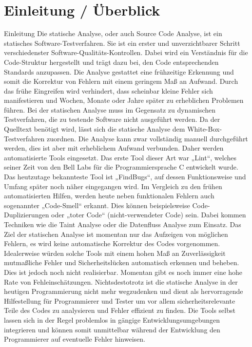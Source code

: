 \section{Einleitung / \"Uberblick}
Einleitung
Die statische Analyse, oder auch Source Code Analyse, ist ein statisches Software-Testverfahren. Sie ist ein erster und unverzichtbarer Schritt verschiedenster Software-Qualitäts-Kontrollen. Dabei wird ein Verständnis für die Code-Struktur hergestellt und trägt dazu bei, den Code entsprechenden Standards anzupassen.
Die Analyse gestattet eine frühzeitige Erkennung und somit die Korrektur von Fehlern mit einem geringem Maß an Aufwand. Durch das frühe Eingreifen wird verhindert, dass scheinbar kleine Fehler sich manifestieren und Wochen, Monate oder Jahre später zu erheblichen Problemen führen. 
Bei der statischen Analyse muss im Gegensatz zu dynamischen Testverfahren, die zu testende Software nicht ausgeführt werden. Da der Quelltext benötigt wird, lässt sich die statische Analyse dem White-Box-Testverfahren zuordnen.
Die Analyse kann zwar vollständig manuell durchgeführt werden, dies ist aber mit erheblichem Aufwand verbunden. Daher werden automatisierte Tools eingesetzt. Das erste Tool dieser Art war „Lint“, welches seiner Zeit von den Bell Labs für die Programmiersprache C entwickelt wurde. Das heutzutage bekannteste Tool ist „FindBugs“, auf dessen Funktionsweise und Umfang später noch näher eingegangen wird. Im Vergleich zu den frühen automatisierten Hilfen, werden heute neben funktionalen Fehlern auch sogenannter „Code-Smell“ erkannt. Dies können beispielsweise Code-Duplizierungen oder „toter Code“ (nicht-verwendeter Code) sein. Dabei kommen Techniken wie die Taint Analyse oder die Datenfluss Analyse zum Einsatz.
Das Ziel der statischen Analyse ist momentan nur das Aufzeigen von möglichen Fehlern, es wird keine automatische Korrektur des Codes vorgenommen. Idealerweise würden solche Tools mit einem hohen Maß an Zuverlässigkeit mutmaßliche Fehler und Sicherheitslücken automatisch erkennen und beheben. Dies ist jedoch noch nicht realisierbar. Momentan gibt es noch immer eine hohe Rate von Fehleinschätzungen. 
Nichtsdestotrotz ist die statische Analyse in der heutigen Programmierung nicht mehr wegzudenken und dient als hervorragende Hilfestellung für Programmierer und Tester um vor allem sicherheitsrelevante Teile des Codes zu analysieren und Fehler effizient zu finden.
Die Tools selbst lassen sich in der Regel problemlos in gängige Entwicklungsumgebungen integrieren und können somit unmittelbar während der Entwicklung den Programmierer auf eventuelle Fehler hinweisen.

